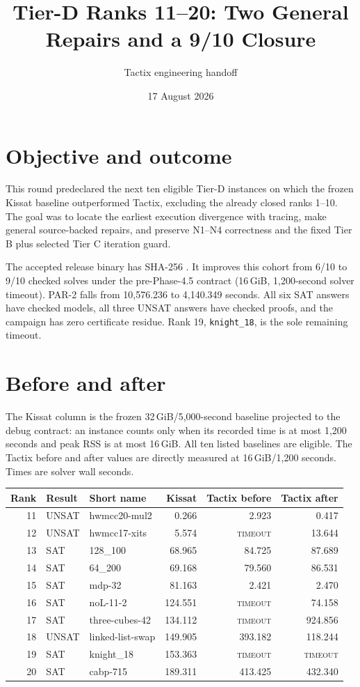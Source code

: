 \documentclass[11pt]{article}
\title{Tier-D Ranks 11--20: Two General Repairs and a 9/10 Closure}
\author{Tactix engineering handoff}
\date{17 August 2026}
\newcommand{\code}[1]{\texttt{#1}}
\newcommand{\tout}{\textsc{timeout}}
\begin{document}
\maketitle

\section*{Objective and outcome}
This round predeclared the next ten eligible Tier-D instances on which the
frozen Kissat baseline outperformed Tactix, excluding the already closed ranks
1--10.  The goal was to locate the earliest execution divergence with tracing,
make general source-backed repairs, and preserve N1--N4 correctness and the
fixed Tier B plus selected Tier C iteration guard.

The accepted release binary has SHA-256
{\footnotesize{}}.
It improves this cohort from 6/10 to 9/10 checked solves under the pre-Phase-4.5
contract (16\,GiB, 1,200-second solver timeout).  PAR-2 falls from 10,576.236 to
4,140.349 seconds.  All six SAT answers have checked models, all three UNSAT
answers have checked proofs, and the campaign has zero certificate residue.
Rank 19, \code{knight\_18}, is the sole remaining timeout.

\section*{Before and after}
The Kissat column is the frozen 32\,GiB/5,000-second baseline projected to the
debug contract: an instance counts only when its recorded time is at most
1,200 seconds and peak RSS is at most 16\,GiB.  All ten listed baselines are
eligible.  The Tactix before and after values are directly measured at
16\,GiB/1,200 seconds.  Times are solver wall seconds.

\begin{center}
\small
\begin{tabular}{rllrrr}
\toprule
Rank & Result & Short name & Kissat & Tactix before & Tactix after \\
\midrule
11 & UNSAT & hwmcc20-mul2       & 0.266   & 2.923   & 0.417 \\
12 & UNSAT & hwmcc17-xits       & 5.574   & \tout  & 13.644 \\
13 & SAT   & 128\_100           & 68.965  & 84.725  & 87.689 \\
14 & SAT   & 64\_200            & 69.168  & 79.560  & 86.531 \\
15 & SAT   & mdp-32             & 81.163  & 2.421   & 2.470 \\
16 & SAT   & noL-11-2           & 124.551 & \tout  & 74.158 \\
17 & SAT   & three-cubes-42     & 134.112 & \tout  & 924.856 \\
18 & UNSAT & linked-list-swap   & 149.905 & 393.182 & 118.244 \\
19 & SAT   & knight\_18         & 153.363 & \tout  & \tout \\
20 & SAT   & cabp-715           & 189.311 & 413.425 & 432.340 \\
\bottomrule
\end{tabular}
\end{center}
\end{document}
